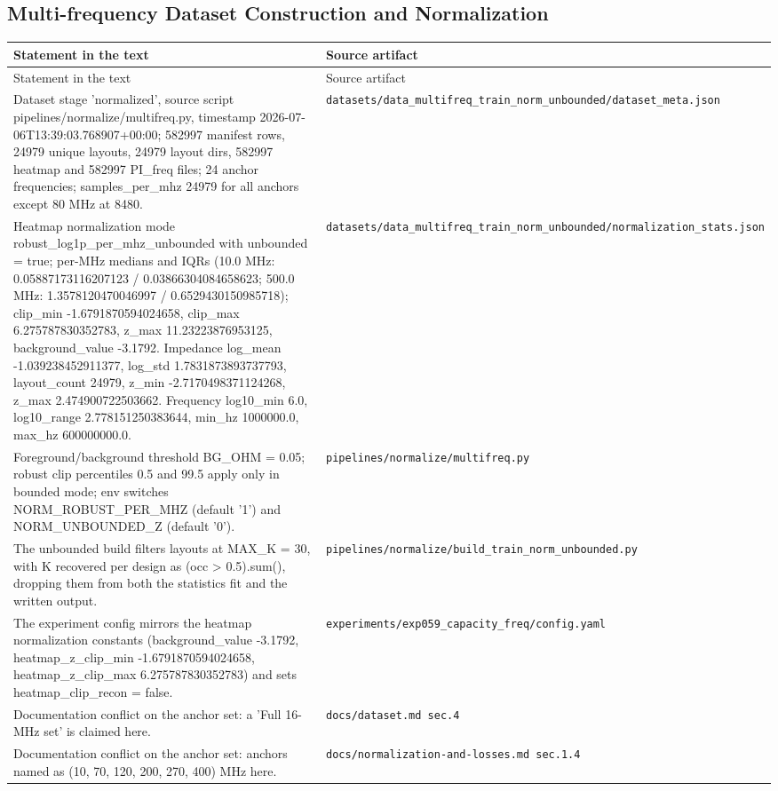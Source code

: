 \subsection*{Multi-frequency Dataset Construction and Normalization}
\begingroup\small
\begin{longtable}{p{} p{}}
\hline
Statement in the text & Source artifact \\
\hline
\endfirsthead
\hline
Statement in the text & Source artifact \\
\hline
\endhead
Dataset stage 'normalized', source script pipelines/normalize/multifreq.py, timestamp 2026-07-06T13:39:03.768907+00:00; 582997 manifest rows, 24979 unique layouts, 24979 layout dirs, 582997 heatmap and 582997 PI\_freq files; 24 anchor frequencies; samples\_per\_mhz 24979 for all anchors except 80 MHz at 8480. & \texttt{datasets/\allowbreak{}data\_\allowbreak{}multifreq\_\allowbreak{}train\_\allowbreak{}norm\_\allowbreak{}unbounded/\allowbreak{}dataset\_\allowbreak{}meta.json} \\
Heatmap normalization mode robust\_log1p\_per\_mhz\_unbounded with unbounded = true; per-MHz medians and IQRs (10.0 MHz: 0.05887173116207123 / 0.03866304084658623; 500.0 MHz: 1.3578120470046997 / 0.6529430150985718); clip\_min -1.6791870594024658, clip\_max 6.275787830352783, z\_max 11.23223876953125, background\_value -3.1792. Impedance log\_mean -1.039238452911377, log\_std 1.7831873893737793, layout\_count 24979, z\_min -2.7170498371124268, z\_max 2.474900722503662. Frequency log10\_min 6.0, log10\_range 2.778151250383644, min\_hz 1000000.0, max\_hz 600000000.0. & \texttt{datasets/\allowbreak{}data\_\allowbreak{}multifreq\_\allowbreak{}train\_\allowbreak{}norm\_\allowbreak{}unbounded/\allowbreak{}normalization\_\allowbreak{}stats.json} \\
Foreground/background threshold BG\_OHM = 0.05; robust clip percentiles 0.5 and 99.5 apply only in bounded mode; env switches NORM\_ROBUST\_PER\_MHZ (default '1') and NORM\_UNBOUNDED\_Z (default '0'). & \texttt{pipelines/\allowbreak{}normalize/\allowbreak{}multifreq.py} \\
The unbounded build filters layouts at MAX\_K = 30, with K recovered per design as (occ > 0.5).sum(), dropping them from both the statistics fit and the written output. & \texttt{pipelines/\allowbreak{}normalize/\allowbreak{}build\_\allowbreak{}train\_\allowbreak{}norm\_\allowbreak{}unbounded.py} \\
The experiment config mirrors the heatmap normalization constants (background\_value -3.1792, heatmap\_z\_clip\_min -1.6791870594024658, heatmap\_z\_clip\_max 6.275787830352783) and sets heatmap\_clip\_recon = false. & \texttt{experiments/\allowbreak{}exp059\_\allowbreak{}capacity\_\allowbreak{}freq/\allowbreak{}config.yaml} \\
Documentation conflict on the anchor set: a 'Full 16-MHz set' is claimed here. & \texttt{docs/\allowbreak{}dataset.md sec.4} \\
Documentation conflict on the anchor set: anchors named as (10, 70, 120, 200, 270, 400) MHz here. & \texttt{docs/\allowbreak{}normalization-and-losses.md sec.1.4} \\
\hline
\end{longtable}
\endgroup

